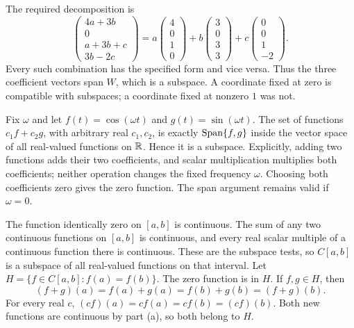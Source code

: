 The required decomposition is
\[
 \begin{pmatrix}4a+3b\\0\\a+3b+c\\3b-2c\end{pmatrix}
 =a\begin{pmatrix}4\\0\\1\\0\end{pmatrix}
 +b\begin{pmatrix}3\\0\\3\\3\end{pmatrix}
 +c\begin{pmatrix}0\\0\\1\\-2\end{pmatrix}.
\]
Every such combination has the specified form and vice versa. Thus the
three coefficient vectors span $W$, which is a subspace. A coordinate fixed
at zero is compatible with subspaces; a coordinate fixed at nonzero $1$ was not.

Fix $\omega$ and let $f(t)=\cos(\omega t)$ and $g(t)=\sin(\omega t)$.
The set of functions $c_1f+c_2g$, with arbitrary real $c_1,c_2$, is exactly
$\operatorname{Span}\{f,g\}$ inside the vector space of all real-valued functions on $\mathbb{R}$.
Hence it is a subspace. Explicitly, adding two functions adds their two
coefficients, and scalar multiplication multiplies both coefficients; neither
operation changes the fixed frequency $\omega$. Choosing both coefficients
zero gives the zero function. The span argument remains valid if $\omega=0$.

The function identically zero on $[a,b]$ is continuous. The sum of any two
continuous functions on $[a,b]$ is continuous, and every real scalar multiple
of a continuous function there is continuous. These are the subspace tests,
so $C[a,b]$ is a subspace of all real-valued functions on that interval.
Let $H=\{f\in C[a,b]:f(a)=f(b)\}$. The zero function is in $H$.
If $f,g\in H$, then
\[
 (f+g)(a)=f(a)+g(a)=f(b)+g(b)=(f+g)(b).
\]
For every real $c$, $(cf)(a)=cf(a)=cf(b)=(cf)(b)$.
Both new functions are continuous by part (a), so both belong to $H$.

